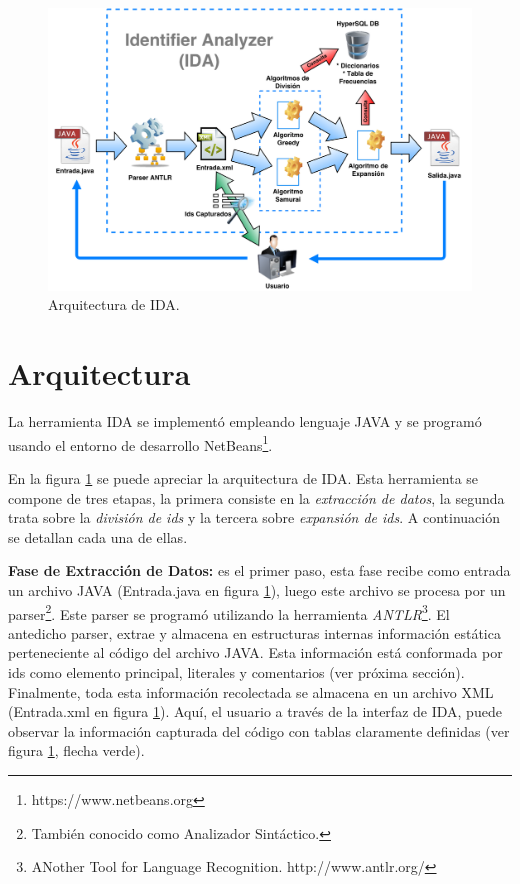 \documentclass[a4paper,12pt]{report}
\begin{document}
\pagebreak
\begin{figure}[ht] %
\centerline{%
\includegraphics[scale= 0.35]{./ida_arq.png}
}
\caption{Arquitectura de IDA.}
\label{arq1}
\end{figure}

\section{Arquitectura}

La herramienta IDA se implementó empleando lenguaje JAVA y se programó usando el entorno de desarrollo NetBeans\footnote[1]{https://www.netbeans.org}. 

En la figura \ref{arq1} se puede apreciar la arquitectura de IDA. Esta herramienta se compone de tres etapas, la primera consiste en la \textit{extracción de datos}, la segunda trata sobre la \textit{división de ids} y la tercera sobre \textit{expansión de ids}. A continuación se detallan cada una de ellas.

\textbf{Fase de Extracción de Datos:} es el primer paso, esta fase recibe como entrada un archivo JAVA (Entrada.java en figura \ref{arq1}), luego este archivo se procesa por un parser\footnote[1]{También conocido como Analizador Sintáctico.}. Este parser se programó utilizando la herramienta \textit{ANTLR}\footnote[2]{ANother Tool for Language Recognition. http://www.antlr.org/}. El antedicho parser, extrae y almacena en estructuras internas información estática perteneciente al código del archivo JAVA. Esta información está conformada por ids como elemento principal, literales y comentarios (ver próxima sección). Finalmente, toda esta información recolectada se almacena en un archivo XML (Entrada.xml en figura \ref{arq1}). Aquí, el usuario a través de la interfaz de IDA, puede observar la información capturada del código con tablas claramente definidas (ver figura \ref{arq1}, flecha verde).
\end{document}
